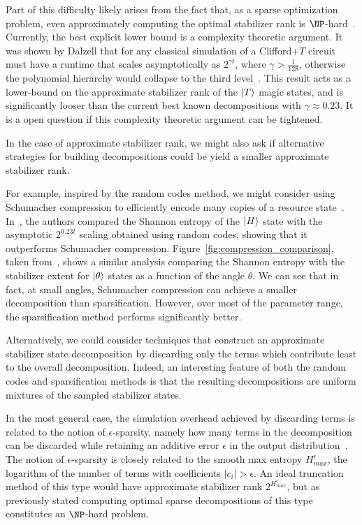 Part of this difficulty likely arises from the fact that, as a sparse optimization problem, even approximately computing the optimal stabilizer rank is $\NP$-hard~\cite{Natarajan1995}. Currently, the best explicit lower bound is a complexity theoretic argument. It was shown by Dalzell that for any classical simulation of a Clifford+$T$ circuit must have a runtime that scales asymptotically as $2^{\gamma t}$, where $\gamma > \frac{1}{128}$, otherwise the polynomial hierarchy would collapse to the third level~\cite{Dalzell2017}. This result acts as a lower-bound on the approximate stabilizer rank of the $\ket{T}$ magic states, and is significantly looser than the current best known decompositions with $\gamma\approx 0.23$. It is a open question if this complexity theoretic argument can be tightened.\par
In the case of approximate stabilizer rank, we might also ask if alternative strategies for building decompositions could be yield a smaller approximate stabilizer rank.\par
For example, inspired by the random codes method, we might consider using Schumacher compression to efficiently encode many copies of a resource state~\cite{Schumacher1995}. In~\cite{Bravyi2016}, the authors compared the Shannon entropy of the $\ket{H}$ state with the asymptotic $2^{0.23t}$ scaling obtained using random codes, showing that it outperforms Schumacher compression. Figure~\ref{fig:compression_comparison}, taken from~\cite{Bravyi2017}, shows a similar analysis comparing the Shannon entropy with the stabilizer extent for $\ket{\theta}$ states as a function of the angle $\theta$. We can see that in fact, at small angles, Schumacher compression can achieve a smaller decomposition than sparsification. However, over most of the parameter range, the sparsification method performs significantly better.\par
Alternatively, we could consider techniques that construct an approximate stabilizer state decomposition by discarding only the terms which contribute least to the overall decomposition. Indeed, an interesting feature of both the random codes and sparsification methods is that the resulting decompositions are uniform mixtures of the sampled stabilizer states.\par
In the most general case, the simulation overhead achieved by discarding terms is related to the notion of $\epsilon$-sparsity, namely how many terms in the decomposition can be discarded while retaining an additive error $\epsilon$ in the output distribution~\cite{Pashayan2017}. The notion of $\epsilon$-sparsity is closely related to the smooth max entropy $H_{max}^{\epsilon}$, the logarithm of the number of terms with coefficients $\left|c_{i}\right|>\epsilon$. An ideal truncation method of this type would have approximate stabilizer rank $2^{H_{max}^{\epsilon}}$, but as previously stated computing optimal sparse decompositions of this type constitutes an $\NP$-hard problem.\par

